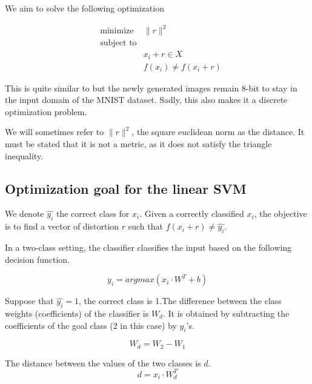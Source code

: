 \documentclass{article} %
\begin{document}
We aim to solve the following optimization

\begin{equation}
\label{eq:optimization}
\begin{aligned}
& {\text{minimize}}
&   \lVert{r} \rVert^2\\
& \text{subject to} \\
& & x_i + r \in X \\
& & f(x_i) \neq f(x_i + r)
\end{aligned}
\end{equation}

This is quite similar to \citep{szegedy_intriguing_2013} but the newly
generated images remain 8-bit to stay in the input domain of the MNIST dataset.
Sadly, this also makes it a discrete optimization problem.

We will sometimes refer to $\lVert{r} \rVert^2$, the square euclidean norm as the distance. It must be stated that it is not a metric, as it does not satisfy the triangle inequality.


\subsection{Optimization goal for the linear SVM}

We denote $\widehat{y_i}$ the correct class for $x_i$. Given a correctly
classified $x_i$, the objective is to find a vector of distortion $r$ such that $f(x_i + r) \neq  \widehat{y_i}$.

In a two-class setting, the classifier classifies the input based on the following decision function.

\begin{equation}
\label{eq:decision_function}
  y_i = argmax (x_i \cdot W^T + b)
\end{equation}

Suppose that $\widehat{y_i} = 1$, the correct class is 1.The difference between the class weights (coefficients) of the classifier is $W_d$.
It is obtained by subtracting the coefficients of the goal class (2 in 
this case) by $\widehat{y_i}$'s.

\begin{equation}
\label{eq:difference}
  W_d = W_2 - W_1
\end{equation}

The distance between the values of the two classes is $d$.
\begin{equation}
\label{eq:gap}
  d = x_i \cdot W_d^T
\end{equation}
\end{document}
